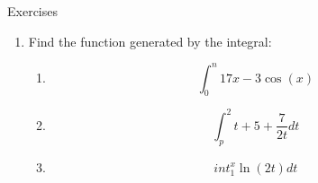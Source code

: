 \documentclass[../revisedmain.tex]{subfiles}
\begin{document}
	\newpage
	\begin{center}
		\LARGE Exercises
	\end{center}
	\begin{enumerate}
		\item Find the function generated by the integral:
		\begin{enumerate}
			\item $$\int_{0}^{n}17x-3\cos(x)$$
			\item $$\int_{p}^{2}t+5+\frac{7}{2t}dt$$
			\item $$int_{1}^{x}\ln(2t)dt$$
		\end{enumerate}
	\end{enumerate}
\end{document}

